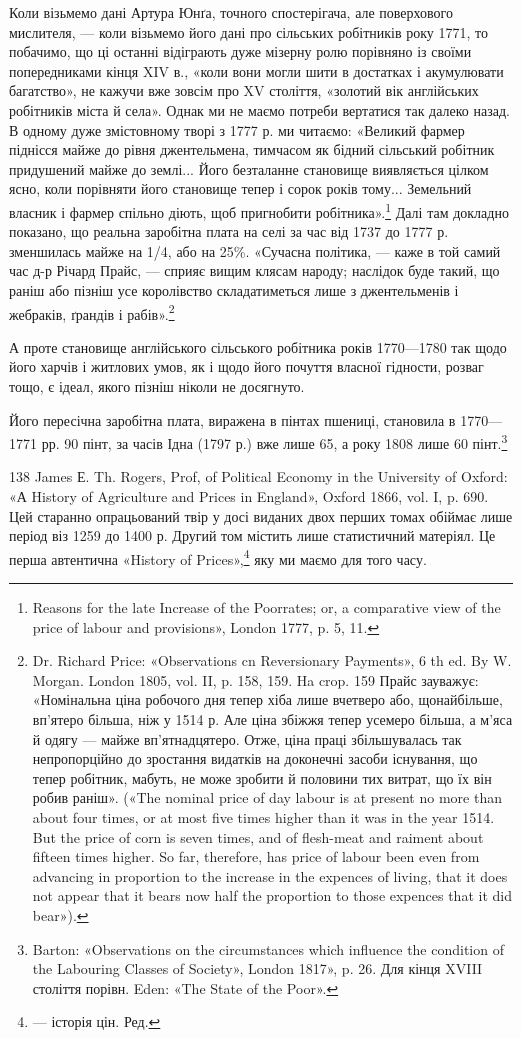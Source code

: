 Коли візьмемо дані Артура Юнґа, точного спостерігача, але
поверхового мислителя, — коли візьмемо його дані про сільських
робітників року 1771, то побачимо, що ці останні відіграють дуже
мізерну ролю порівняно із своїми попередниками кінця XIV в.,
«коли вони могли шити в достатках і акумулювати багатство»,
не кажучи вже зовсім про XV століття, «золотий вік англійських
робітників міста й села». Однак ми не маємо потреби
вертатися так далеко назад. В одному дуже змістовному творі
з 1777 р. ми читаємо: «Великий фармер піднісся майже до рівня
джентельмена, тимчасом як бідний сільський робітник придушений
майже до землі... Його безталанне становище виявляється
цілком ясно, коли порівняти його становище тепер і сорок років
тому... Земельний власник і фармер спільно діють, щоб пригнобити
робітника».\footnote{
Reasons for the late Increase of the Poorrates; or, a comparative
view of the price of labour and provisions», London 1777, p. 5, 11.
} Далі там докладно показано, що реальна
заробітна плата на селі за час від 1737 до 1777 р. зменшилась
майже на 1/4,  або на 25\%. «Сучасна політика, — каже в той самий
час д-р Річард Прайс, — сприяє вищим клясам народу; наслідок
буде такий, що раніш або пізніш усе королівство складатиметься
лише з джентельменів і жебраків, ґрандів і рабів».\footnote{
Dr. Richard Price: «Observations cn Reversionary Payments»,
6 th ed. By W. Morgan. London 1805, vol. II, p. 158, 159. Ha crop. 159
Прайс зауважує: «Номінальна ціна робочого дня тепер хіба лише вчетверо
або, щонайбільше, вп’ятеро більша, ніж у 1514 р. Але ціна збіжжя тепер
усемеро більша, а м’яса й одягу — майже вп’ятнадцятеро. Отже, ціна
праці збільшувалась так непропорційно до зростання видатків на доконечні
засоби існування, що тепер робітник, мабуть, не може зробити й
половини тих витрат, що їх він робив раніш». («The nominal price of
day labour is at present no more than about four times, or at most five times
higher than it was in the year 1514. But the price of corn is seven times,
and of flesh-meat and raiment about fifteen times higher. So far, therefore,
has price of labour been even from advancing in proportion to the
increase in the expences of living, that it does not appear that it bears now
half the proportion to those expences that it did bear»).
}

А проте становище англійського сільського робітника років
1770—1780 так щодо його харчів і житлових умов, як і щодо
його почуття власної гідности, розваг тощо, є ідеал, якого пізніш
ніколи не досягнуто.

Його пересічна заробітна плата, виражена в пінтах пшениці,
становила в 1770—1771 рр. 90 пінт, за часів Ідна (1797 р.)
вже лише 65, а року 1808 лише 60 пінт.\footnote{
Barton: «Observations on the circumstances which influence the
condition of the Labouring Classes of Society», London 1817», p. 26. Для
кінця XVIII століття порівн. Eden: «The State of the Poor».
}

138 James Е. Th. Rogers, Prof, of Political Economy in the University
of Oxford: «А History of Agriculture and Prices in England», Oxford
1866, vol. I, p. 690. Цей старанно опрацьований твір у досі виданих двох
перших томах обіймає лише період віз 1259 до 1400 р. Другий том містить
лише статистичний матеріял. Це перша автентична «History of Prices»,\footnote*{
— історія цін. Ред.
}
яку ми маємо для того часу.